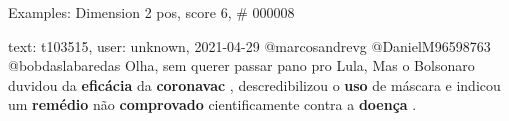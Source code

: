\begin{frame}{Examples: Dimension 2 pos, score 6, \# 000008}
\footnotesize
\begin{exampleblock}{text: t103515, user: unknown, 2021-04-29}
@marcosandrevg @DanielM96598763 @bobdaslabaredas Olha, sem querer passar pano 
pro Lula, Mas o Bolsonaro duvidou da \textbf{eficácia} da \textbf{coronavac} , 
descredibilizou o \textbf{uso} de máscara e indicou um \textbf{remédio} não 
\textbf{comprovado} cientificamente contra a \textbf{doença} . 
\end{exampleblock}
\end{frame}
